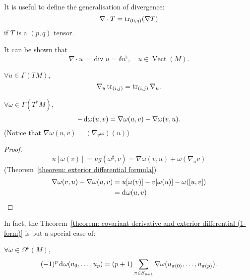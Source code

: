 \documentclass[openany, oneside, a5paper]{book}
\DeclareMathOperator{\Vect}{Vect}
\begin{document}
It is useful to define the generalisation of divergence:
\begin{equation}
    \nabla \cdot T = \operatorname{tr}_{(0, q)} (\nabla T)
\end{equation}
if $T$ is a $(p, q)$ tensor.

It can be shown that
\begin{equation}
    \nabla \cdot u = \operatorname{div} u = \delta u^\flat,
    \quad
    u \in \Vect(M).
\end{equation}

\begin{theorem}
    $\forall u \in \Gamma(TM)$,
    \begin{equation}
        \nabla_u \operatorname{tr}_{(i, j)} = \operatorname{tr}_{(i, j)} \nabla_u.
    \end{equation}
\end{theorem}

\begin{theorem}\label{theorem: covariant derivative and exterior differential (1-form)}
    $\forall \omega \in \Gamma(T^*M)$,
    \begin{equation}
        - \mathop{}\!\mathrm{d}^{} \omega(u, v) = \nabla \omega(u, v) - \nabla\omega(v, u).
    \end{equation}
    (Notice that $\nabla \omega(u, v) = (\nabla_v \omega) (u)$)
\end{theorem}
\begin{proof}
    \begin{equation}
        u[\omega(v)] = u g(\omega^\sharp, v) = \nabla \omega(v, u) + \omega(\nabla_u v)
    \end{equation}
    \hence (Theorem~\ref{theorem: exterior differential formula})
    \begin{align}
        \nabla \omega(v, u) - \nabla \omega (u, v) 
        &= u[\omega(v)] - v[\omega(u)] - \omega([u, v])
        \\
        &= \mathop{}\!\mathrm{d}^{} \omega(u, v)
    \end{align}
\end{proof}

In fact, the Theorem~\ref{theorem: covariant derivative and exterior differential (1-form)} is but a special case of:
\begin{theorem}\label{theorem: covariant derivative and exterior differential}
    $\forall \omega \in \Omega^p(M)$,
    \begin{equation}
        (-1)^p \mathop{}\!\mathrm{d}^{} \omega(u_0, \ldots, u_p) = 
        (p + 1) \sum_{\pi \in S_{p + 1}} \nabla \omega (u_{\pi(0)}, \ldots, u_{\pi(p)}).
    \end{equation}
    
\end{theorem}
\end{document}
